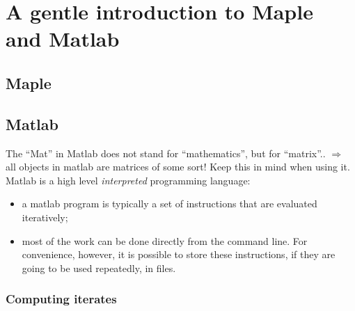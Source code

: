 \chapter{A gentle introduction to Maple and Matlab}
\label{chap:matlab}


\section{Maple}

\section{Matlab}
The ``Mat'' in Matlab does not stand for ``mathematics'', but for ``matrix''..
$\Rightarrow$ all objects in matlab are matrices of some sort! Keep this in mind when using it.
Matlab is a high level \emph{interpreted} programming language: 
\begin{itemize}
\item a matlab program is typically a set of instructions that are evaluated iteratively;
\item most of the work can be done directly from the command line. For convenience, however, it is possible to store these instructions, if they are going to be used repeatedly, in files.
\end{itemize}

\subsection{Computing iterates}



